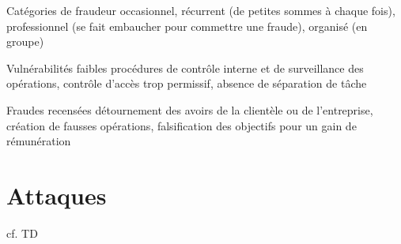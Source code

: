 \begin{reveals}
\begin{frame}
  \vfill

  \begin{block}{Catégories de fraudeur}
    occasionnel, récurrent (de petites sommes à chaque fois), professionnel (se fait embaucher pour commettre une fraude), organisé (en groupe)
  \end{block}

  \vfill

  \begin{block}{Vulnérabilités}
    faibles procédures de contrôle interne et de surveillance des opérations, contrôle d'accès trop permissif, absence de séparation de tâche
  \end{block}

  \vfill

  \begin{block}{Fraudes recensées}
    détournement des avoirs de la clientèle ou de l'entreprise,
    création de fausses opérations, falsification des objectifs pour
    un gain de rémunération
  \end{block}

\end{frame}

\section{Attaques}

\begin{frame}

  \vfill

  \Large cf. TD
  
  \vfill
\end{frame}


\end{reveals}



